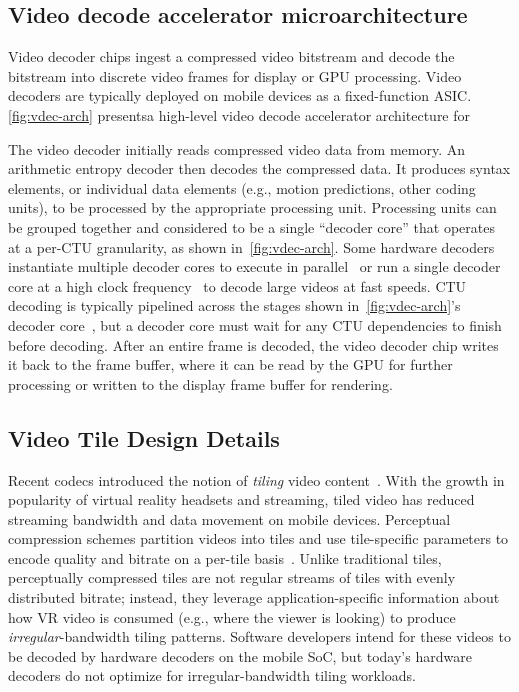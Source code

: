 \subsection{Video decode accelerator microarchitecture}
\label{subsec:vd-arch}
Video decoder chips ingest a compressed video bitstream and decode the bitstream into discrete video frames for display or GPU processing.
Video decoders are typically deployed on mobile devices as a fixed-function ASIC.
\ref{fig:vdec-arch} presentsa high-level video decode accelerator architecture for \hevc

The video decoder initially reads compressed video data from memory.
An arithmetic entropy decoder then decodes the compressed data.
It produces syntax elements, or individual data elements (e.g., motion predictions, other coding units), to be processed by the appropriate processing unit.
Processing units can be grouped together and considered to be a single ``decoder core'' that operates at a per-CTU granularity, as shown in~\ref{fig:vdec-arch}.
Some hardware decoders instantiate multiple decoder cores to execute in parallel~\cite{tikekar18ijssc} or run a single decoder core at a high clock frequency~\cite{8khevc-ijssc} to decode large videos at fast speeds.
CTU decoding is typically pipelined across the stages shown in~\ref{fig:vdec-arch}'s decoder core~\cite{8khevc-ijssc}, but a decoder core must wait for any CTU dependencies to finish before decoding.
After an entire frame is decoded, the video decoder chip writes it back to the frame buffer, where it can be read by the GPU for further processing or written to the display frame buffer for rendering.

\subsection{Video Tile Design Details}
\label{subsec:tiles}

Recent codecs introduced the notion of \emph{tiling} video content~\cite{misra2013tiles}.
With the growth in popularity of virtual reality headsets and \threesixty streaming, tiled video has reduced streaming bandwidth and data movement on mobile devices.
Perceptual compression schemes partition videos into tiles and use tile-specific parameters to encode quality and bitrate on a per-tile basis~\cite{visualcloud2017haynes}.
Unlike traditional \hevc tiles, perceptually compressed tiles are not regular streams of tiles with evenly distributed bitrate; instead, they leverage application-specific information about how VR video is consumed (e.g., where the viewer is looking) to produce \emph{irregular}-bandwidth tiling patterns.
Software developers intend for these videos to be decoded by hardware decoders on the mobile SoC, but today's hardware decoders do not optimize for irregular-bandwidth tiling workloads.

